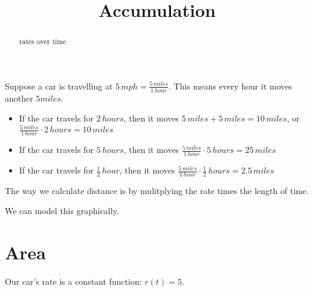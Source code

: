 \documentclass{ximera}
\title{Accumulation}
\begin{document}
\begin{abstract}
rates over time
\end{abstract}
\maketitle



Suppose a car is travelling at $5 \, mph = \frac{5 \, miles}{1 \, hour}$. This means every hour it moves another $5 miles$.

\begin{itemize}
\item If the car travels for $2 \, hours$, then it moves $5 \, miles + 5 \, miles = 10 \, miles$, or $\frac{5 \, miles}{1 \, hour} \cdot 2 \, hours = 10 \, miles$

\item If the car travels for $5 \, hours$, then it moves $\frac{5 \, miles}{1 \, hour} \cdot 5 \, hours = 25 \, miles$

\item If the car travels for $\frac{1}{2} \, hour$, then it moves $\frac{5 \, miles}{1 \, hour} \cdot \frac{1}{2} \, hours = 2.5 \,miles$
\end{itemize}


The way we calculate distance is by mulitplying the rate times the length of time.

We can model this graphically.










\section{Area}




Our car's rate is a constant function: $r(t) = 5$. \\
\end{document}
